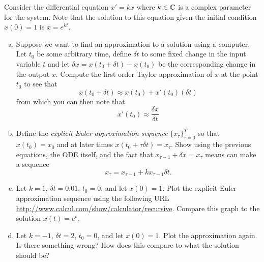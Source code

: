 \documentclass[12pt]{article} %
\begin{document}
\begin{problem}
	Consider the differential equation $x'=kx$ where $k\in \mathbb{C}$ is a complex parameter for the system. Note that the solution to this equation given the initial condition $x(0)=1$ is $x=e^{kt}$. 
	\begin{enumerate}[(a)]
		\item Suppose we want to find an approximation to a solution using a computer. Let $t_0$ be some arbitrary time, define $\delta t$ to some fixed change in the input variable $t$ and let $\delta x =x(t_0+\delta t)-x(t_0)$ be the corresponding change in the output $x$. Compute the first order Taylor approximation of $x$ at the point $t_0$ to see that
		\begin{equation}
			\label{eq:1}
		x(t_0+\delta t) \approx x(t_0)+x'(t_0)(\delta t)
		\end{equation}
		from which you can then note that
		\begin{equation}
			\label{eq:2}
		x'(t_0) \approx \frac{\delta x}{\delta t}
		\end{equation}
	\item Define the \emph{explicit Euler approximation sequence} $\{x_\tau\}_{\tau=0}^T$ so that $x(t_0)=x_0$ and at later times $x(t_0+\tau\delta t)=x_\tau$. Show using the previous equations, the ODE itself, and the fact that $x_{\tau-1}+\delta x = x_{\tau}$ means can make a sequence
	\[
	x_{\tau} = x_{\tau-1} + kx_{\tau-1} \delta t.
	\]
	\item Let $k=1$, $\delta t = 0.01$, $t_0=0$, and let $x(0)=1$. Plot the explicit Euler approximation sequence using the following URL \url{http://www.calcul.com/show/calculator/recursive}. Compare this graph to the solution $x(t)=e^{t}$.
	\item Let $k=-1$, $\delta t = 2$, $t_0=0$, and let $x(0)=1$. Plot the approximation again. Is there something wrong? How does this compare to what the solution should be?
	\end{enumerate}
\end{problem}
\end{document}
